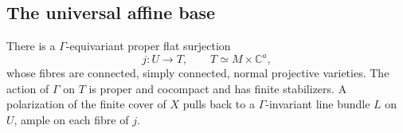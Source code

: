 \subsection{The universal affine base}

\begin{proposition}
\label{cmp:affine-base}
There is a $\Gamma$-equivariant proper flat surjection
\[
                    j:U\longrightarrow T,
          \qquad T\simeq M\times\mathbb C^a,
\]
whose fibres are connected, simply connected, normal projective
varieties.  The action of $\Gamma$ on $T$ is proper and cocompact and
has finite stabilizers.  A polarization of the finite cover of $X$
pulls back to a $\Gamma$-invariant line bundle $L$ on $U$, ample on
each fibre of $j$.
\end{proposition}

